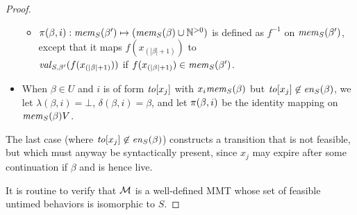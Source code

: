 \begin{proof}
\begin{itemize}
\begin{itemize}
      \item $\pi(\beta,i):\mathit{mem}_{S}(\beta') \mapsto (\mathit{mem}_{S}(\beta) \cup {\mathbb N}^{>0})$ is defined as $f^{-1}$ on
        $\mathit{mem}_{S}(\beta')$, except that it maps
        $f(x_{(|\beta|+1)})$ to
        \\
        $\mathit{val}_{S,\beta'}(f(x_{(|\beta|+1)}))$
        if $f(x_{(|\beta|+1)}) \in \mathit{mem}_{S}(\beta')$.
  \end{itemize}
\item When $\beta \in U$ and $i$ is of form $\mathit{to}[x_j]$ with
  $x_i \mathit{mem}_{S}(\beta)$ but
  $\mathit{to}[x_j] \not\in\mathit{en}_{S}(\beta)$, we let
  $\lambda(\beta,i) = \bot$, 
  $\delta(\beta,i) = \beta$, and let
  $\pi(\beta,i)$ be the identity mapping on $\mathit{mem}_{S}(\beta){V}$.
\end{itemize}
The last case (where  $\mathit{to}[x_j] \not\in\mathit{en}_{S}(\beta)$)
constructs a transition that is not feasible,
but which must anyway be syntactically present, since $x_j$
may expire after some continuation if $\beta$ and is hence live.

It is routine to verify that ${\mathcal M}$ is a well-defined MMT whose set of feasible untimed behaviors is isomorphic to $S$.
\end{proof}




